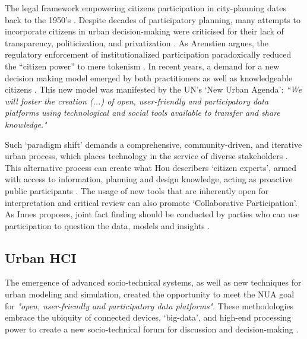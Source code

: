 {The legal framework empowering citizens participation in city-planning dates back to the 1950's \cite{banerjee2011companion}. Despite decades of participatory planning, many attempts to incorporate citizens in urban decision-making were criticised for their lack of transparency, politicization, and privatization \cite{Innes2016}. As Arenstien argues, the regulatory enforcement of institutionalized participation paradoxically reduced the ``citizen power'' to mere tokenism \cite{arnstein1969ladder}. In recent years, a demand for a new decision making model emerged by both practitioners as well as knowledgeable citizens \cite{green2019smart, Glaeser2011, gaffney2018smarter}. This new model was manifested by the UN's `New Urban Agenda': \textit{``We will foster the creation (...) of open, user-friendly and participatory data platforms using technological and social tools available to transfer and share knowledge."} \cite{habitat2016new}}

{Such `paradigm shift' demands a comprehensive, community-driven, and iterative urban process, which places technology in the service of diverse stakeholders \cite{soderstrom2014smart}. This alternative process can create what Hou describers `citizen experts', armed with access to information, planning and design knowledge, acting as proactive public participants \cite{banerjee2011companion}. The usage of new tools that are inherently open for interpretation and critical review can also promote `Collaborative Participation'. As Innes proposes, joint fact finding should be conducted by parties who can use participation to question the data, models and insights \cite{Innes2016}.}

\subsection{Urban HCI}

{The emergence of advanced socio-technical systems, as well as new techniques for urban modeling and simulation, created the opportunity to meet the NUA goal for \textit{"open, user-friendly and participatory data platforms"}. These methodologies embrace the ubiquity of connected devices, `big-data', and high-end processing power to create a new socio-technical forum for discussion and decision-making \cite{batty2013new, Ben-Joseph2001}.}

